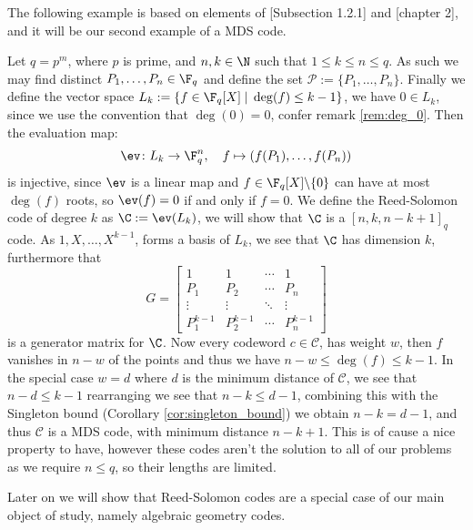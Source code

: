 The following example is based on elements of \citep{alg_geom_codes}[Subsection 1.2.1] and \citep{notes_on_alg_geom_codes}[chapter 2], and it will be our second example of a MDS code.
\begin{example}
  Let $q = p^{m}$, where $p$ is prime, and $n, k \in \N$ such that $1 \leq k \leq n \leq q$. As such we may find distinct $P_{1}, \ldots, P_{n} \in \F_{q}$ and define the set $\mathcal{P} := \{P_{1}, \ldots, P_{n}\}$. Finally we define the vector space $L_{k} := \{f \in \F_{q}[X] \;\vert\; \deg(f) \leq k - 1\}$, we have $0 \in L_{k}$, since we use the convention that $\deg(0) = 0$, confer remark \ref{rem:deg_0}.
  Then the evaluation map:
  \begin{align*}
    \ev\colon L_{k} \to \F_{q}^{n}, \quad f \mapsto (f(P_{1}), \ldots, f(P_{n}))
  \end{align*}
  is injective, since $\ev$ is a linear map and $f \in \F_{q}[X] \backslash \{0\}$ can have at most $\deg(f)$ roots, so $\ev(f) = 0$ if and only if $f = 0$.
  We define the Reed-Solomon code of degree $k$ as $\C := \ev(L_{k})$, we will show that $\C$ is a $[n, k, n - k + 1]_{q}$ code.
  As $1, X, \ldots, X^{k - 1}$, forms a basis of $L_{k}$, we see that $\C$ has dimension $k$, furthermore that
  \begin{equation*}
    G = \begin{bmatrix}
          1 & 1 & \cdots & 1\\
          P_{1} & P_{2} & \cdots & P_{n} \\
          \vdots & \vdots & \ddots & \vdots \\
          P_{1}^{k - 1} & P_{2}^{k - 1} & \cdots & P_{n}^{k -  1}
    \end{bmatrix}
  \end{equation*}
  is a generator matrix for $\C$.
  Now every codeword $c \in \mathcal{C}$, has weight $w$, then $f$ vanishes in $n - w$ of the points and thus we have $n - w \leq \deg(f) \leq k - 1$.
  In the special case $w = d$ where $d$ is the minimum distance of $\mathcal{C}$, we see that $n - d \leq k - 1$ rearranging we see that $n - k \leq d - 1$, combining this with the Singleton bound (Corollary \ref{cor:singleton_bound}) we obtain $n - k = d - 1$, and thus $\mathcal{C}$ is a MDS code, with minimum distance $n - k + 1$. This is of cause a nice property to have, however these codes aren't the solution to all of our problems as we require $n \leq q$, so their lengths are limited.
\end{example}
Later on we will show that Reed-Solomon codes are a special case of our main object of study, namely algebraic geometry codes.
